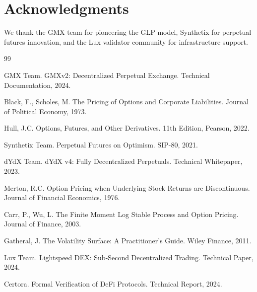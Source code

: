\section*{Acknowledgments}


We thank the GMX team for pioneering the GLP model, Synthetix for perpetual futures innovation, and the Lux validator community for infrastructure support.


\begin{thebibliography}{99}

GMX Team. GMXv2: Decentralized Perpetual Exchange. Technical Documentation, 2024.

Black, F., Scholes, M. The Pricing of Options and Corporate Liabilities. Journal of Political Economy, 1973.

Hull, J.C. Options, Futures, and Other Derivatives. 11th Edition, Pearson, 2022.

Synthetix Team. Perpetual Futures on Optimism. SIP-80, 2021.

dYdX Team. dYdX v4: Fully Decentralized Perpetuals. Technical Whitepaper, 2023.

Merton, R.C. Option Pricing when Underlying Stock Returns are Discontinuous. Journal of Financial Economics, 1976.

Carr, P., Wu, L. The Finite Moment Log Stable Process and Option Pricing. Journal of Finance, 2003.

Gatheral, J. The Volatility Surface: A Practitioner's Guide. Wiley Finance, 2011.

Lux Team. Lightspeed DEX: Sub-Second Decentralized Trading. Technical Paper, 2024.

Certora. Formal Verification of DeFi Protocols. Technical Report, 2024.

\end{thebibliography}

